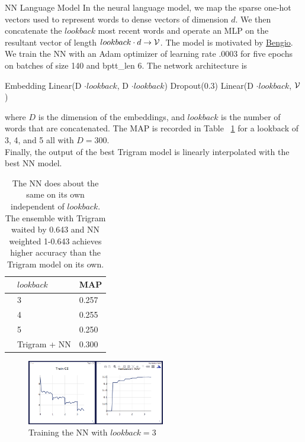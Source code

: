 \documentclass[11pt]{article}
\begin{document}
\begin{subsection}{NN Language Model}
In the neural language model, we map the sparse one-hot vectors used to represent words to dense vectors of dimension $d$. We then concatenate the $lookback$ most recent words and operate an MLP on the resultant vector of length $lookback \cdot d \rightarrow \mathcal{V}$. The model is motivated by \href{http://www.jmlr.org/papers/volume3/bengio03a/bengio03a.pdf}{Bengio}.\\
We train the NN with an Adam optimizer of learning rate .0003 for five epochs on batches of size 140 and bptt\_len 6. The network architecture is\\
\centerline{ Embedding \rightarrow Linear(D $\cdot lookback$, D $\cdot lookback$) \rightarrow Dropout(0.3) \rightarrow Linear(D $\cdot lookback$, $\mathcal{V}$) }
where $D$ is the dimension of the embeddings, and $lookback$ is the number of words that are concatenated. The MAP is recorded in Table ~\ref{tab:NN} for a lookback of 3, 4, and 5 all with $D=300$.\\
Finally, the output of the best Trigram model is linearly interpolated with the best NN model.\\

\begin{table}
  \begin{center}
    \begin{tabular}{@{}lll@{}}
      \toprule
      & $lookback$ & MAP\\
      \midrule
      & 3 & 0.257 \\
      & 4 & 0.255 \\
      & 5 & 0.250 \\
      \bottomrule
      & Trigram + NN & 0.300\\ 
      \bottomrule
    \end{tabular}
  \end{center}
  \caption{\label{tab:NN} The NN does about the same on its own independent of $lookback$. The ensemble with Trigram waited by 0.643 and NN weighted 1-0.643 achieves higher accuracy than the Trigram model on its own.}
 \end{table}
 
 \begin{figure}
  \centering
  \includegraphics[width=6cm]{imgs/nntrain}
  \caption{\label{fig:clusters} Training the NN with $lookback=3$}
\end{figure}




\end{subsection}
\end{document}

